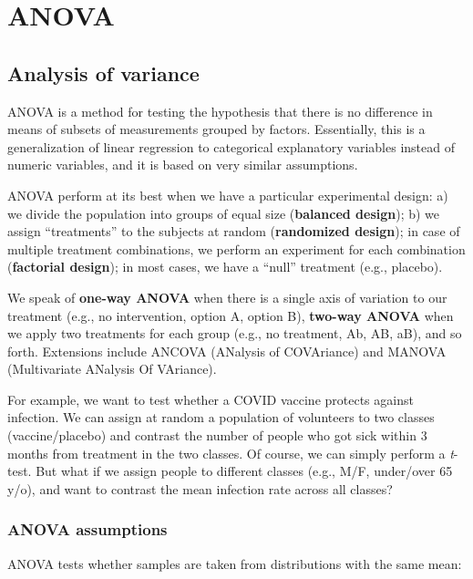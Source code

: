 \documentclass[
  letterpaper,
  DIV=11,
  numbers=noendperiod]{scrreprt}
\begin{document}

\chapter{ANOVA}\label{anova}

\section{Analysis of variance}\label{analysis-of-variance}

ANOVA is a method for testing the hypothesis that there is no difference
in means of subsets of measurements grouped by factors. Essentially,
this is a generalization of linear regression to categorical explanatory
variables instead of numeric variables, and it is based on very similar
assumptions.

ANOVA perform at its best when we have a particular experimental design:
a) we divide the population into groups of equal size (\textbf{balanced
design}); b) we assign ``treatments'' to the subjects at random
(\textbf{randomized design}); in case of multiple treatment
combinations, we perform an experiment for each combination
(\textbf{factorial design}); in most cases, we have a ``null'' treatment
(e.g., placebo).

We speak of \textbf{one-way ANOVA} when there is a single axis of
variation to our treatment (e.g., no intervention, option A, option B),
\textbf{two-way ANOVA} when we apply two treatments for each group
(e.g., no treatment, Ab, AB, aB), and so forth. Extensions include
ANCOVA (ANalysis of COVAriance) and MANOVA (Multivariate ANalysis Of
VAriance).

For example, we want to test whether a COVID vaccine protects against
infection. We can assign at random a population of volunteers to two
classes (vaccine/placebo) and contrast the number of people who got sick
within 3 months from treatment in the two classes. Of course, we can
simply perform a \emph{t}-test. But what if we assign people to
different classes (e.g., M/F, under/over 65 y/o), and want to contrast
the mean infection rate across all classes?

\subsection{ANOVA assumptions}\label{anova-assumptions}

ANOVA tests whether samples are taken from distributions with the same
mean:
\end{document}
